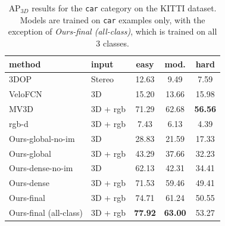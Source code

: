 \documentclass[10pt,twocolumn,letterpaper]{article}
\begin{document}
\begin{table}
\centering
\caption{AP$_{3D}$ results for the \texttt{car} category on the KITTI dataset.  Models are trained on \texttt{car} examples only, with the exception of \textit{Ours-final (all-class)}, which is trained on all 3 classes.}
\label{table:kitti-car}
\begin{tabular}{|l|l|ccc|}
\hline
method & input & easy     & mod.   & hard     \\ \hline
3DOP\cite{3dop}         & Stereo                                      & 12.63    & 9.49       & 7.59           \\
VeloFCN\cite{velofcn}   & 3D                                       & 15.20    & 13.66      & 15.98       \\
MV3D~\cite{mv3d}        & 3D + rgb                                 & 71.29    & 62.68      & \textbf{56.56}  \\
rgb-d                    & 3D + rgb                                & 7.43     & 6.13       & 4.39      \\
Ours-global-no-im       & 3D                                       & 28.83    & 21.59      & 17.33   \\
Ours-global             & 3D + rgb                                 & 43.29    & 37.66      & 32.23    \\
Ours-dense-no-im        & 3D                                       & 62.13    & 42.31      & 34.41    \\
Ours-dense              & 3D + rgb                                 & 71.53    & 59.46      & 49.41  \\
Ours-final              & 3D + rgb                                 & 74.71    & 61.24      & 50.55  \\
Ours-final (all-class)  & 3D + rgb                                 & \textbf{77.92}    & \textbf{63.00}      & 53.27 \\

\hline
\end{tabular}
\end{table}
\end{document}
